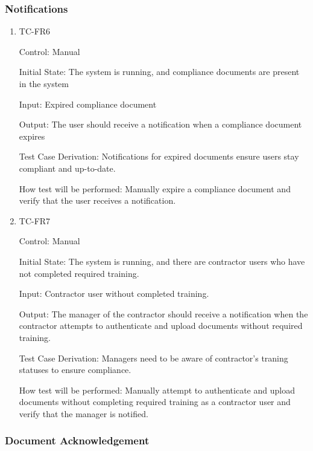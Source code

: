 \documentclass[12pt, titlepage]{article}
\begin{document}
\subsubsection{Notifications}

\begin{enumerate}
  \item {TC-FR6\\}

    Control: Manual

    Initial State: The system is running, and compliance documents are present
    in the system

    Input: Expired compliance document

    Output: The user should receive a notification when a compliance document
    expires

    Test Case Derivation: Notifications for expired documents ensure users stay
    compliant and up-to-date.

    How test will be performed: Manually expire a compliance document and verify
    that the user receives a notification.

  \item {TC-FR7\\}

    Control: Manual

    Initial State: The system is running, and there are contractor users who
    have not completed required training.

    Input: Contractor user without completed training.

    Output: The manager of the contractor should receive a notification when the
    contractor attempts to authenticate and upload documents without required
    training.

    Test Case Derivation: Managers need to be aware of contractor's traning
    statuses to ensure compliance.

    How test will be performed: Manually attempt to authenticate and upload
    documents without completing required training as a contractor user and
    verify that the manager is notified.

\end{enumerate}

\subsubsection{Document Acknowledgement}
\end{document}
